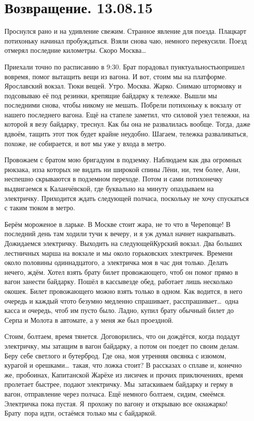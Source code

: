 \chapter{Возвращение. 13.08.15}

Проснулся рано и на удивление свежим. Странное явление для поезда. Плацкарт потихоньку начинал пробуждаться. Взяли снова чаю, немного перекусили. Поезд отмерял последние километры. Скоро Москва\ldots~

Приехали точно по расписанию в 9:30. Брат порадовал пунктуальностью\mdash пришел вовремя, помог вытащить вещи из вагона. И вот, стоим мы на платформе. Ярославский вокзал. Тюки вещей. Утро. Москва. Жарко. Снимаю штормовку и подсовываю её под резинки, крепящие байдарку к тележке. Вышли мы последними снова, чтобы никому не мешать. Побрели потихоньку к вокзалу от нашего последнего вагона. Ещё на стапеле заметил, что силовой узел тележки, на которой я везу байдарку, треснул. Как бы она не развалилась вообще. Тогда, даже вдвоём, тащить этот тюк будет крайне неудобно. Шагаем, тележка разваливаться, похоже, не собирается, и вот мы уже у входа в метро. 

Провожаем с братом мою бригаду\mdash им в подземку. Наблюдаем как два огромных рюкзака, из\sdash за которых не видать ни широкой спины Лёни, ни, тем более, Ани, неспешно скрываются в подземном переходе. Потом и сами потихонечку выдвигаемся к Каланчёвской, где буквально на минуту опаздываем на электричку. Приходится ждать следующей полчаса, поскольку не хочу спускаться с таким тюком в метро. 

Берём мороженое в ларьке. В Москве стоит жара, не то что в Череповце! В последний день там ходили тучи к вечеру, и я уж думал начнет накрапывать. Дожидаемся электричку. Выходить на следующей\mdash Курский вокзал. Два больших лестничных марша на вокзале и мы около горьковских электричек. Времени около половины одиннадцатого, а электричка моя в час дня только. Делать нечего, ждём. Хотел взять брату билет провожающего, чтоб он помог прямо в вагон занести байдарку. Пошёл в кассы\mdash везде обед, работает лишь несколько окошек. Билет провожающего можно взять только в одном. Как водится, в него очередь и каждый что\sdash то безумно медленно спрашивает, расспрашивает\ldots~одна касса и очередь, чтоб им пусто было. Ладно, купил брату обычный билет до Серпа и Молота в автомате, а у меня же был проездной. 

Стоим, болтаем, время тянется. Договорились, что он дождётся, когда подадут электричку, мы затащим в вагон байдарку, а потом он поедет по своим делам. Беру себе светлого и бутерброд. Где она, моя утренняя овсянка с изюмом, курагой и орешками\ldots~такая, что ложка стоит? В рассказах о сплаве и, конечно же, пробоинах, Капитанской Жарёхе из лисичек и прочих приключениях, время пролетает быстрее, подают электричку. Мы~затаскиваем байдарку и герму в вагон, отправление через полчаса. Ещё немного болтаем, сидим, смеёмся. Электричка пока пустая. Я~прохожу по вагону и открываю все окна\mdash жарко! Брату~пора идти, остаёмся только мы с байдаркой. 

